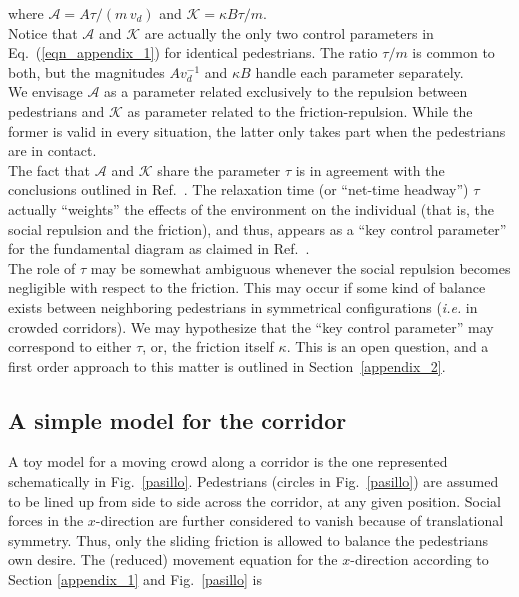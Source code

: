 \documentclass[preprint,12pt]{elsarticle}
\begin{document}
\noindent where $\mathcal{A}=A\tau/(m\,v_d)$ and 
$\mathcal{K}=\kappa B\tau/m$. \\ 

Notice that $\mathcal{A}$ and $\mathcal{K}$ are actually the only two 
control parameters in Eq.~(\ref{eqn_appendix_1}) for identical 
pedestrians. The ratio $\tau/m$ is common to both, but the magnitudes 
$Av_d^{-1}$ and $\kappa B$ handle each parameter separately.\\

We envisage $\mathcal{A}$ as a parameter related exclusively to the 
repulsion between pedestrians and $\mathcal{K}$  as parameter related to the friction-repulsion.
While the former is valid in every situation, the latter only takes part when the
pedestrians are in contact.\\

The fact that $\mathcal{A}$ and $\mathcal{K}$ share the parameter $\tau$ is 
in agreement with the conclusions outlined in Ref.~\cite{johansson}. The 
relaxation time (or ``net-time headway'') $\tau$ actually ``weights'' the 
effects of the environment on the individual (that is, the social repulsion and 
the friction), and thus, appears as a ``key control parameter'' for the 
fundamental diagram as claimed in Ref.~\cite{johansson}.\\

The role of $\tau$ may be somewhat ambiguous whenever the social 
repulsion becomes negligible with respect to the friction. This may occur if 
some kind of balance exists between neighboring pedestrians in 
symmetrical configurations (\textit{i.e.} in crowded corridors). We may 
hypothesize that the ``key control parameter'' may correspond to either 
$\tau$, or, the friction itself $\kappa$. This is an open question, and a 
first order approach to this matter is outlined in Section~\ref{appendix_2}.\\


\subsection{\label{appendix_2}A simple model for the corridor}

A toy model for a moving crowd along a corridor is the one represented 
schematically in Fig.~\ref{pasillo}. Pedestrians (circles in 
Fig.~\ref{pasillo}) 
are assumed to be lined up from side to side across the corridor, at any given 
position. Social forces in the $x$-direction are further considered to vanish 
because of translational symmetry. Thus, only the sliding friction is allowed 
to balance the pedestrians own desire. The (reduced) movement equation for 
the $x$-direction according to Section \ref{appendix_1} and Fig.~\ref{pasillo} 
is  
\end{document}
